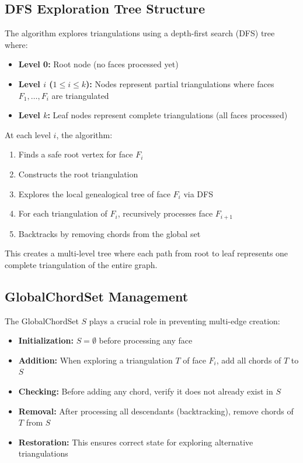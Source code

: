 \documentclass[12pt,a4paper]{article}
\theoremstyle{definition}
\theoremstyle{remark}
\begin{document}
\subsection{DFS Exploration Tree Structure}

The algorithm explores triangulations using a depth-first search (DFS) tree where:

\begin{itemize}
    \item \textbf{Level 0:} Root node (no faces processed yet)
    \item \textbf{Level $i$ ($1 \leq i \leq k$):} Nodes represent partial triangulations where faces $F_1, \ldots, F_i$ are triangulated
    \item \textbf{Level $k$:} Leaf nodes represent complete triangulations (all faces processed)
\end{itemize}

At each level $i$, the algorithm:
\begin{enumerate}
    \item Finds a safe root vertex for face $F_i$
    \item Constructs the root triangulation
    \item Explores the local genealogical tree of face $F_i$ via DFS
    \item For each triangulation of $F_i$, recursively processes face $F_{i+1}$
    \item Backtracks by removing chords from the global set
\end{enumerate}

This creates a multi-level tree where each path from root to leaf represents one complete triangulation of the entire graph.

\subsection{GlobalChordSet Management}

The GlobalChordSet $S$ plays a crucial role in preventing multi-edge creation:

\begin{itemize}
    \item \textbf{Initialization:} $S = \emptyset$ before processing any face
    \item \textbf{Addition:} When exploring a triangulation $T$ of face $F_i$, add all chords of $T$ to $S$
    \item \textbf{Checking:} Before adding any chord, verify it does not already exist in $S$
    \item \textbf{Removal:} After processing all descendants (backtracking), remove chords of $T$ from $S$
    \item \textbf{Restoration:} This ensures correct state for exploring alternative triangulations
\end{itemize}
\end{document}
